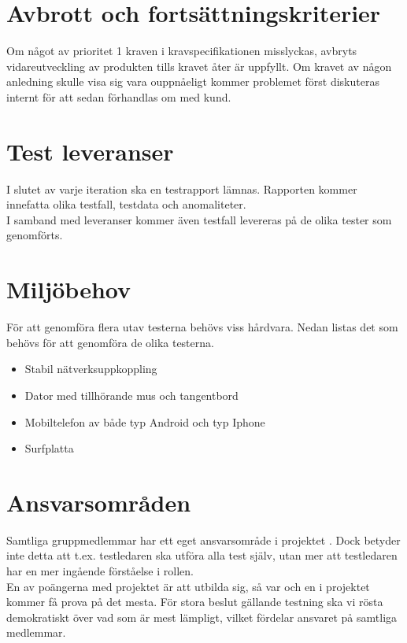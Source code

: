 \section{Avbrott och fortsättningskriterier}
	Om något av prioritet 1 kraven i kravspecifikationen \cite{bib-kravspec} misslyckas, avbryts vidareutveckling av produkten tills kravet åter är uppfyllt. Om kravet av någon anledning skulle visa sig vara ouppnåeligt kommer problemet först diskuteras internt för att sedan förhandlas om med kund.



\section{Test leveranser}
	I slutet av varje iteration ska en testrapport lämnas. Rapporten kommer innefatta olika testfall, testdata och anomaliteter.\\

	I samband med leveranser kommer även testfall levereras på de olika tester som genomförts.




\section{Miljöbehov}
	För att genomföra flera utav testerna behövs viss hårdvara. Nedan listas det som behövs för att genomföra de olika testerna.

	\begin{itemize}
	\item Stabil nätverksuppkoppling
	\item Dator med tillhörande mus och tangentbord
	\item Mobiltelefon av både typ Android och typ Iphone
	\item Surfplatta
	\end{itemize}

\section{Ansvarsområden}
	Samtliga gruppmedlemmar har ett eget ansvarsområde i projektet \cite{bib-projektplan}. Dock betyder inte detta att t.ex. testledaren ska utföra alla test själv, utan mer att testledaren har en mer ingående förståelse i rollen.\\
  
	En av poängerna med projektet är att utbilda sig, så var och en i projektet kommer få prova på det mesta. För stora beslut gällande testning ska vi rösta demokratiskt över vad som är mest lämpligt, vilket fördelar ansvaret på samtliga medlemmar.


